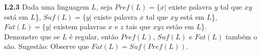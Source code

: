 
\noindent \textbf{L2.3} Dada uma linguagem $L$, seja $Pref(L) = \{x |$ existe palavra $y$ tal que $xy$ está em $L$\}, $Suf(L) = \{y |$ existe palavra $x$ tal que $xy$ está em $L$\}, $Fat(L) = \{y |$ existem palavras $x$ e $z$ tais que $xyz$ estão em $L$\}.\\
Demonstre que se $L$ é regular, então $Pref(L)$, $Suf(L)$ e $Fat(L)$ também o são. Sugestão: Observe que $Fat(L) = Suf(Pref(L))$.\\[3pt]